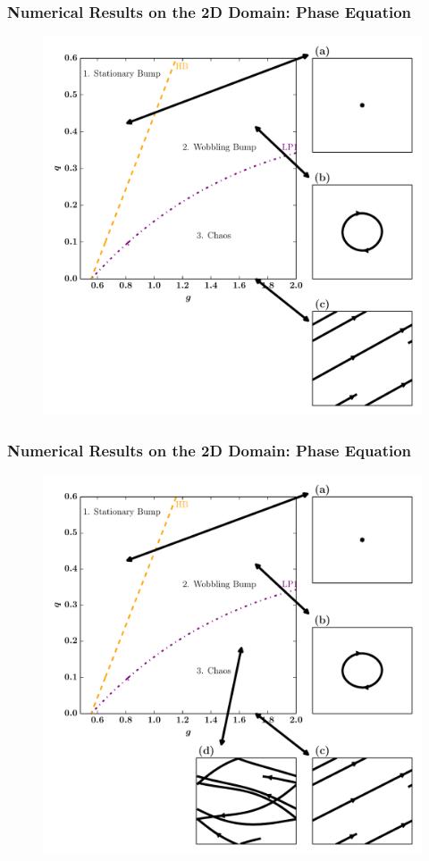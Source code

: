 \documentclass{beamer}
\begin{document}
\begin{frame}
\frametitle{Numerical Results on the 2D Domain: Phase Equation}
\begin{figure}
 \includegraphics[width=.6\textwidth]{twod_phase_2par3.pdf}

\end{figure}
\end{frame}

\begin{frame}
\frametitle{Numerical Results on the 2D Domain: Phase Equation}
\begin{figure}
 \includegraphics[width=.6\textwidth]{twod_phase_2par4.pdf}

\end{figure}
\end{frame}
\end{document}
